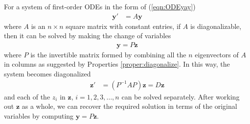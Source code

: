 \begin{proper}
\label{proper:diagODE}
For a system of first-order ODEs in the form of (\ref{eqn:ODEyay}) 
\begin{align*}
\textbf{y}' &= A\textbf{y}
\end{align*}
where $A$ is an $n \times n$ square matrix with constant entries, if $A$ is diagonalizable, then it can be solved by making the change of variables
\begin{align}
\textbf{y} = P\textbf{z}
\end{align}
where $P$ is the invertible matrix formed by combining all the $n$ eigenvectors of $A$ in columns as suggested by Properties \ref{proper:diagonalize}. In this way, the system becomes diagonalized
\begin{align}
\textbf{z}' &= (P^{-1}AP)\textbf{z} = D\textbf{z}
\end{align}
and each of the $z_i$ in $\textbf{z}$, $i= 1,2,3,\ldots,n$ can be solved separately. After working out $\textbf{z}$ as a whole, we can recover the required solution in terms of the original variables by computing $\textbf{y} = P\textbf{z}$.
\end{proper}

